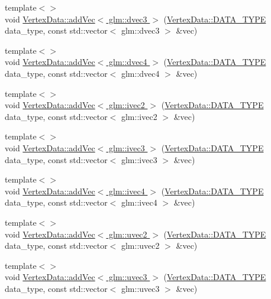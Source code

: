 \begin{DoxyCompactItemize}
\item 
{\footnotesize template$<$$>$ }\\void \hyperlink{namespace_graphics_a17f019729a88fee51283bfac3e389d8c}{Vertex\+Data\+::add\+Vec$<$ glm\+::dvec3 $>$} (\hyperlink{class_graphics_1_1_vertex_data_a50e88236939dc2a3ec4df7aeb728620e}{Vertex\+Data\+::\+D\+A\+T\+A\+\_\+\+T\+Y\+P\+E} data\+\_\+type, const std\+::vector$<$ glm\+::dvec3 $>$ \&vec)
\item 
{\footnotesize template$<$$>$ }\\void \hyperlink{namespace_graphics_a49036388178e150a368a51224af14bf0}{Vertex\+Data\+::add\+Vec$<$ glm\+::dvec4 $>$} (\hyperlink{class_graphics_1_1_vertex_data_a50e88236939dc2a3ec4df7aeb728620e}{Vertex\+Data\+::\+D\+A\+T\+A\+\_\+\+T\+Y\+P\+E} data\+\_\+type, const std\+::vector$<$ glm\+::dvec4 $>$ \&vec)
\item 
{\footnotesize template$<$$>$ }\\void \hyperlink{namespace_graphics_ae74009723a975e3c513caabed1179510}{Vertex\+Data\+::add\+Vec$<$ glm\+::ivec2 $>$} (\hyperlink{class_graphics_1_1_vertex_data_a50e88236939dc2a3ec4df7aeb728620e}{Vertex\+Data\+::\+D\+A\+T\+A\+\_\+\+T\+Y\+P\+E} data\+\_\+type, const std\+::vector$<$ glm\+::ivec2 $>$ \&vec)
\item 
{\footnotesize template$<$$>$ }\\void \hyperlink{namespace_graphics_a728451ca83bc1512de4a643a8a15f660}{Vertex\+Data\+::add\+Vec$<$ glm\+::ivec3 $>$} (\hyperlink{class_graphics_1_1_vertex_data_a50e88236939dc2a3ec4df7aeb728620e}{Vertex\+Data\+::\+D\+A\+T\+A\+\_\+\+T\+Y\+P\+E} data\+\_\+type, const std\+::vector$<$ glm\+::ivec3 $>$ \&vec)
\item 
{\footnotesize template$<$$>$ }\\void \hyperlink{namespace_graphics_aac489b10c9c03300de07e4c8ad96199a}{Vertex\+Data\+::add\+Vec$<$ glm\+::ivec4 $>$} (\hyperlink{class_graphics_1_1_vertex_data_a50e88236939dc2a3ec4df7aeb728620e}{Vertex\+Data\+::\+D\+A\+T\+A\+\_\+\+T\+Y\+P\+E} data\+\_\+type, const std\+::vector$<$ glm\+::ivec4 $>$ \&vec)
\item 
{\footnotesize template$<$$>$ }\\void \hyperlink{namespace_graphics_a8e0e10ff44b8eb872a4de0d015f759b9}{Vertex\+Data\+::add\+Vec$<$ glm\+::uvec2 $>$} (\hyperlink{class_graphics_1_1_vertex_data_a50e88236939dc2a3ec4df7aeb728620e}{Vertex\+Data\+::\+D\+A\+T\+A\+\_\+\+T\+Y\+P\+E} data\+\_\+type, const std\+::vector$<$ glm\+::uvec2 $>$ \&vec)
\item 
{\footnotesize template$<$$>$ }\\void \hyperlink{namespace_graphics_a5dfa8775c3d6f76682cb395a554320f3}{Vertex\+Data\+::add\+Vec$<$ glm\+::uvec3 $>$} (\hyperlink{class_graphics_1_1_vertex_data_a50e88236939dc2a3ec4df7aeb728620e}{Vertex\+Data\+::\+D\+A\+T\+A\+\_\+\+T\+Y\+P\+E} data\+\_\+type, const std\+::vector$<$ glm\+::uvec3 $>$ \&vec)

\end{DoxyCompactItemize}
